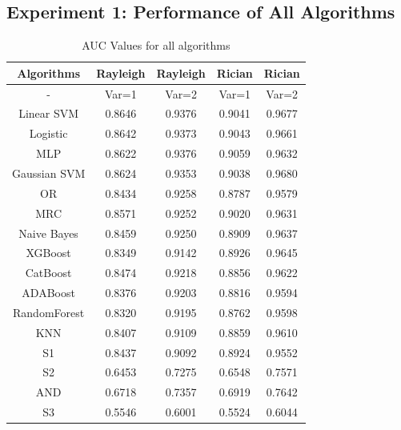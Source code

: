 \subsection{Experiment 1: Performance of All Algorithms}
\begin{table}
\centering
\caption{AUC Values for all algorithms}
    \begin{tabular}{||c c c c c||}
    \hline
    {\bf Algorithms} & {\bf Rayleigh} & {\bf Rayleigh} & {\bf Rician} & {\bf Rician} \\ \hline
    - &  Var=1 &    Var=2 &   Var=1 & Var=2  	\\ \hline

       	Linear SVM 	& 0.8646	& 0.9376	& 0.9041	& 0.9677	\\ \hline
  	Logistic 		& 0.8642	& 0.9373	& 0.9043	& 0.9661	\\ \hline
  	MLP 			& 0.8622	& 0.9376	& 0.9059	& 0.9632	\\ \hline
  	Gaussian SVM 	& 0.8624	& 0.9353	& 0.9038	& 0.9680	\\ \hline
  	OR 			& 0.8434	& 0.9258	& 0.8787	& 0.9579	\\ \hline
  	MRC  			& 0.8571	& 0.9252	& 0.9020	& 0.9631	\\ \hline
  	Naive Bayes 	& 0.8459	& 0.9250	& 0.8909	& 0.9637	\\ \hline
  	XGBoost 		& 0.8349	& 0.9142	& 0.8926	& 0.9645	\\ \hline
  	CatBoost 		& 0.8474	& 0.9218	& 0.8856	& 0.9622	\\ \hline
  	ADABoost 		& 0.8376	& 0.9203	& 0.8816	& 0.9594	\\ \hline
  	RandomForest 	& 0.8320	& 0.9195	& 0.8762	& 0.9598	\\ \hline
  	KNN 			& 0.8407	& 0.9109	& 0.8859	& 0.9610	\\ \hline
  	S1 			& 0.8437	& 0.9092	& 0.8924	& 0.9552	\\ \hline
  	S2 			& 0.6453	& 0.7275	& 0.6548	& 0.7571	\\ \hline
  	AND 			& 0.6718	& 0.7357	& 0.6919	& 0.7642	\\ \hline
	S3 			& 0.5546	& 0.6001	& 0.5524	& 0.6044	\\ \hline
    \end{tabular}
\end{table} 




